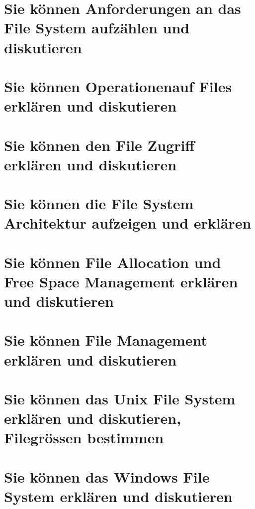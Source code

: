 \documentclass{report}
\theoremstyle{definition}
\theoremstyle{example}
\begin{document}
\section{Sie können Anforderungen an das File System aufzählen und diskutieren}

\section{Sie können Operationenauf Files erklären und diskutieren}

\section{Sie können den File Zugriff erklären und diskutieren}

\section{Sie können die File System Architektur aufzeigen und erklären}

\section{Sie können File Allocation und Free Space Management erklären und diskutieren}

\section{Sie können File Management erklären und diskutieren}

\section{Sie können das Unix File System erklären und diskutieren, Filegrössen bestimmen}

\section{Sie können das Windows File System erklären und diskutieren}
\end{document}

